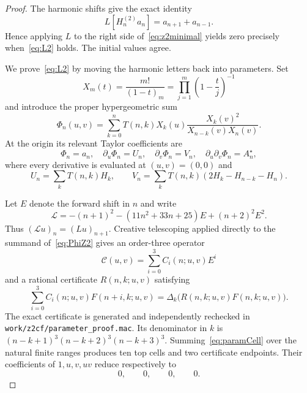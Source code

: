 \documentclass[11pt,reqno]{amsart}
\theoremstyle{definition}
\theoremstyle{remark}
\begin{document}
\begin{proof}
The harmonic shifts give the exact identity
\[
 L[H_n^{(2)}a_n]=a_{n+1}+a_{n-1}.
\]
Hence applying $L$ to the right side of~\eqref{eq:z2minimal} yields zero
precisely when~\eqref{eq:L2} holds.  The initial values agree.

\medskip
We prove~\eqref{eq:L2} by moving the harmonic letters back into parameters.
Set
\begin{equation}\label{eq:Xmt}
 X_m(t)=\frac{m!}{(1-t)_m}
       =\prod_{j=1}^m\left(1-\frac tj\right)^{-1}
\end{equation}
and introduce the proper hypergeometric sum
\begin{equation}\label{eq:PhiZ2}
 \Phi_n(u,v)=\sum_{k=0}^nT(n,k)X_k(u)
 \frac{X_k(v)^2}{X_{n-k}(v)X_n(v)}.
\end{equation}
At the origin its relevant Taylor coefficients are
\begin{equation}\label{eq:PhiDerivs}
 \Phi_n=a_n,\quad \partial_u\Phi_n=U_n,\quad
 \partial_v\Phi_n=V_n,\quad \partial_u\partial_v\Phi_n=A_n^\star,
\end{equation}
where every derivative is evaluated at $(u,v)=(0,0)$ and
\[
 U_n=\sum_kT(n,k)H_k,\qquad
 V_n=\sum_kT(n,k)(2H_k-H_{n-k}-H_n).
\]

Let $E$ denote the forward shift in $n$ and write
\begin{equation}\label{eq:Lforward}
 \mathcal L=-(n+1)^2-(11n^2+33n+25)E+(n+2)^2E^2.
\end{equation}
Thus $(\mathcal Lu)_n=(Lu)_{n+1}$.  Creative telescoping applied directly to
the summand of~\eqref{eq:PhiZ2} gives an order-three operator
\begin{equation}\label{eq:Cparam}
 \mathcal C(u,v)=\sum_{i=0}^3C_i(n;u,v)E^i
\end{equation}
and a rational certificate $R(n,k;u,v)$ satisfying
\begin{equation}\label{eq:paramCell}
 \sum_{i=0}^3C_i(n;u,v)F(n+i,k;u,v)
 =\Delta_k\bigl(R(n,k;u,v)F(n,k;u,v)\bigr).
\end{equation}
The exact certificate is generated and independently rechecked in
\nolinkurl{work/z2cf/parameter_proof.mac}.  Its denominator in $k$ is
$(n-k+1)^3(n-k+2)^3(n-k+3)^3$.  Summing~\eqref{eq:paramCell} over the natural
finite ranges produces ten top cells and two certificate endpoints.  Their
coefficients of $1,u,v,uv$ reduce respectively to
\begin{equation}\label{eq:paramBoundary}
 0,\qquad0,\qquad0,\qquad0.
\end{equation}


\end{proof}
\end{document}
